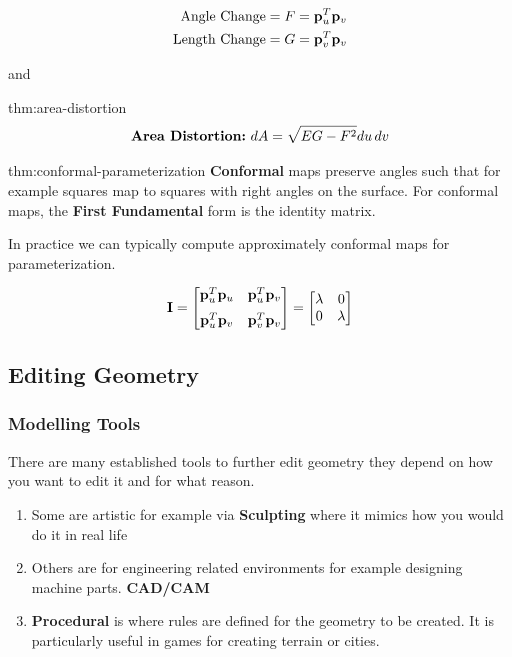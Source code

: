 \documentclass{article}
\begin{document}
\begin{align*}
    \text{Angle Change} &= F = \mathbf{p}_{u}^T \mathbf{p}_{v} \\
    \text{Length Change} &= G = \mathbf{p}_{v}^T \mathbf{p}_{v}
\end{align*}

and 

\begin{defin}{thm:area-distortion}
    \[
        \text{\textbf{Area Distortion:}} \ {dA} = \sqrt{EG - F^2} {du}\,{dv}
    \]
\end{defin}


\begin{defin}{thm:conformal-parameterization}
    \textbf{Conformal} maps preserve angles such that for example squares map to squares with right angles
    on the surface. For conformal maps, the \textbf{First Fundamental} form is the identity matrix.

    \vspace{5px}

    In practice we can typically compute approximately conformal maps for parameterization.
\end{defin}

\[
    \mathbf{I} = 
    \begin{bmatrix}
        \mathbf{p}_{u}^T \mathbf{p}_{u} & \mathbf{p}_{u}^T \mathbf{p}_{v} \\[6pt]
        \mathbf{p}_{u}^T \mathbf{p}_{v} & \mathbf{p}_{v}^T \mathbf{p}_{v}
    \end{bmatrix}
    = 
    \begin{bmatrix}
        \lambda & 0 \\
        0 & \lambda
    \end{bmatrix}
\]

\newpage

\subsection{Editing Geometry}

\vspace{10px}

\subsubsection{Modelling Tools}

There are many established tools to further edit geometry they depend on how you want to edit it and
for what reason.

\vspace{5px}

\begin{enumerate}
    \item Some are artistic for example via \textbf{Sculpting} where it mimics how you would do it in real life
    \item Others are for engineering related environments for example designing machine parts. \textbf{CAD/CAM}
    \item \textbf{Procedural} is where rules are defined for the geometry to be created. It is particularly
    useful in games for creating terrain or cities.
\end{enumerate}
\end{document}
